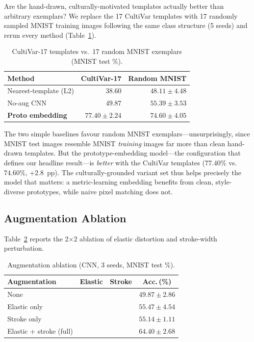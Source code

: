 \documentclass[final,5p,times,twocolumn]{elsarticle}
\newcommand{\cmark}{\ding{51}}
\newcommand{\xmark}{\ding{55}}
\begin{document}
Are the hand-drawn, culturally-motivated templates actually better than arbitrary exemplars?
We replace the 17 CultiVar templates with 17 randomly sampled MNIST training images following
the same class structure (5 seeds) and rerun every method (Table~\ref{tab:variantvalid}).

\begin{table}[t]
  \caption{CultiVar-17 templates vs.\ 17 random MNIST exemplars (MNIST test \%).}
  \label{tab:variantvalid}
  \centering
  \begin{tabular}{@{}lrr@{}}
    \toprule
    Method & CultiVar-17 & Random MNIST \\
    \midrule
    Nearest-template (L2) & $38.60$ & $48.11 \pm 4.48$ \\
    No-aug CNN            & $49.87$ & $55.39 \pm 3.53$ \\
    \textbf{Proto embedding} & $\mathbf{77.40 \pm 2.24}$ & $74.60 \pm 4.05$ \\
    \bottomrule
  \end{tabular}
\end{table}

The two simple baselines favour random MNIST exemplars—unsurprisingly, since MNIST test
images resemble MNIST \emph{training} images far more than clean hand-drawn templates.
But the prototype-embedding model—the configuration that defines our headline result—is
\emph{better} with the CultiVar templates ($77.40\%$ vs.\ $74.60\%$, $+2.8$~pp). The
culturally-grounded variant set thus helps precisely the model that matters: a metric-learning
embedding benefits from clean, style-diverse prototypes, while naive pixel matching does not.

\subsection{Augmentation Ablation}
\label{sec:ablation}

Table~\ref{tab:ablation} reports the 2$\times$2 ablation of elastic distortion and
stroke-width perturbation.

\begin{table}[t]
  \caption{Augmentation ablation (CNN, 3 seeds, MNIST test \%).}
  \label{tab:ablation}
  \centering
  \begin{tabular}{@{}lccc@{}}
    \toprule
    Augmentation & Elastic & Stroke & Acc.\,(\%) \\
    \midrule
    None                   & \xmark & \xmark & $49.87 \pm 2.86$ \\
    Elastic only           & \cmark & \xmark & $55.47 \pm 4.54$ \\
    Stroke only            & \xmark & \cmark & $55.14 \pm 1.11$ \\
    Elastic + stroke (full)& \cmark & \cmark & $64.40 \pm 2.68$ \\
    \bottomrule
  \end{tabular}
\end{table}
\end{document}
